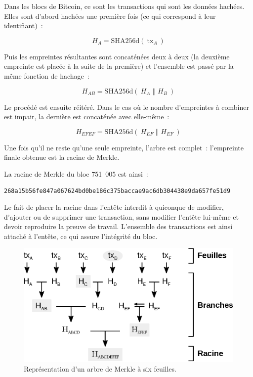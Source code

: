 Dans les blocs de Bitcoin, ce sont les transactions qui sont les données hachées. Elles sont d'abord hachées une première fois (ce qui correspond à leur identifiant)~:

{ \footnotesize
\[
H_A = \mathrm{SHA256d}(~\mathrm{tx}_A~)
\]
}

Puis les empreintes résultantes sont concaténées deux à deux (la deuxième empreinte est placée à la suite de la première) et l'ensemble est passé par la même fonction de hachage~:

{ \footnotesize
\[
H_{A\!B} = \mathrm{SHA256d}(~H_A \parallel H_B~)
\]
}

Le procédé est ensuite réitéré. Dans le cas où le nombre d'empreintes à combiner est impair, la dernière est concaténée avec elle-même~:

{ \footnotesize
\[
H_{E\!F\!E\!F} = \mathrm{SHA256d}(~H_{E\!F} \parallel H_{E\!F}~)
\]
}

Une fois qu'il ne reste qu'une seule empreinte, l'arbre est complet~: l'empreinte finale obtenue est la racine de Merkle.

La racine de Merkle du bloc 751~005 est ainsi~:

\begin{Verbatim}[fontsize=\footnotesize]
268a15b56fe847a067624bd0be186c375baccae9ac6db304438e9da657fe51d9
\end{Verbatim}

Le fait de placer la racine dans l'entête interdit à quiconque de modifier, d'ajouter ou de supprimer une transaction, sans modifier l'entête lui-même et devoir reproduire la preuve de travail. L'ensemble des transactions est ainsi attaché à l'entête, ce qui assure l'intégrité du bloc.

\begin{figure}[h]
  \centering
  \includegraphics[scale=0.8]{img/merkle-tree.eps}
  \caption{Représentation d'un arbre de Merkle à six feuilles.}
  \label{fig:merkle-tree}
\end{figure}


